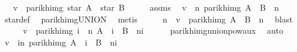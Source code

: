 \begin{isabellebody}
\ \ \ {\isachardoublequoteopen}v\ {\isasymin}\ parikh{\isacharunderscore}{\kern0pt}img\ {\isacharparenleft}{\kern0pt}star\ A\ {\isacharat}{\kern0pt}{\isacharat}{\kern0pt}\ star\ B{\isacharparenright}{\kern0pt}{\isachardoublequoteclose}\isanewline
%
\isadelimproof
%
\endisadelimproof
%
\isatagproof
{}\isamarkupfalse%
\ {\isacharminus}{\kern0pt}\isanewline
\ \ \isamarkupfalse%
\ assms\ \isamarkupfalse%
\ {\isachardoublequoteopen}v\ {\isasymin}\ {\isacharparenleft}{\kern0pt}{\isasymUnion}n{\isachardot}{\kern0pt}\ parikh{\isacharunderscore}{\kern0pt}img\ {\isacharparenleft}{\kern0pt}{\isacharparenleft}{\kern0pt}A\ {\isasymunion}\ B{\isacharparenright}{\kern0pt}\ {\isacharcircum}{\kern0pt}{\isacharcircum}{\kern0pt}\ n{\isacharparenright}{\kern0pt}{\isacharparenright}{\kern0pt}{\isachardoublequoteclose}\isanewline
\ \ \ \ \isamarkupfalse%
\ star{\isacharunderscore}{\kern0pt}def\ \isamarkupfalse%
\ parikh{\isacharunderscore}{\kern0pt}img{\isacharunderscore}{\kern0pt}UNION\ \isamarkupfalse%
\ metis\isanewline
\ \ \isamarkupfalse%
\ \isamarkupfalse%
\ n\ \ {\isachardoublequoteopen}v\ {\isasymin}\ parikh{\isacharunderscore}{\kern0pt}img\ {\isacharparenleft}{\kern0pt}{\isacharparenleft}{\kern0pt}A\ {\isasymunion}\ B{\isacharparenright}{\kern0pt}\ {\isacharcircum}{\kern0pt}{\isacharcircum}{\kern0pt}\ n{\isacharparenright}{\kern0pt}{\isachardoublequoteclose}\ \isamarkupfalse%
\ blast\isanewline
\ \ \isamarkupfalse%
\ \isamarkupfalse%
\ {\isachardoublequoteopen}v\ {\isasymin}\ parikh{\isacharunderscore}{\kern0pt}img\ {\isacharparenleft}{\kern0pt}{\isasymUnion}i\ {\isasymle}\ n{\isachardot}{\kern0pt}\ A\ {\isacharcircum}{\kern0pt}{\isacharcircum}{\kern0pt}\ i\ {\isacharat}{\kern0pt}{\isacharat}{\kern0pt}\ B\ {\isacharcircum}{\kern0pt}{\isacharcircum}{\kern0pt}\ {\isacharparenleft}{\kern0pt}n{\isacharminus}{\kern0pt}i{\isacharparenright}{\kern0pt}{\isacharparenright}{\kern0pt}{\isachardoublequoteclose}\isanewline
\ \ \ \ \isamarkupfalse%
\ parikh{\isacharunderscore}{\kern0pt}img{\isacharunderscore}{\kern0pt}union{\isacharunderscore}{\kern0pt}pow{\isacharunderscore}{\kern0pt}aux{}\ \isamarkupfalse%
\ auto\isanewline
\ \ \isamarkupfalse%
\ \isamarkupfalse%
\ {\isachardoublequoteopen}v\ {\isasymin}\ {\isacharparenleft}{\kern0pt}{\isasymUnion}i{\isasymle}n{\isachardot}{\kern0pt}\ parikh{\isacharunderscore}{\kern0pt}img\ {\isacharparenleft}{\kern0pt}A\ {\isacharcircum}{\kern0pt}{\isacharcircum}{\kern0pt}\ i\ {\isacharat}{\kern0pt}{\isacharat}{\kern0pt}\ B\ {\isacharcircum}{\kern0pt}{\isacharcircum}{\kern0pt}\ {\isacharparenleft}{\kern0pt}n{\isacharminus}{\kern0pt}i{\isacharparenright}{\kern0pt}{\isacharparenright}{\kern0pt}{\isacharparenright}{\kern0pt}{\isachardoublequoteclose}\ \isamarkupfalse%

\end{isabellebody}
